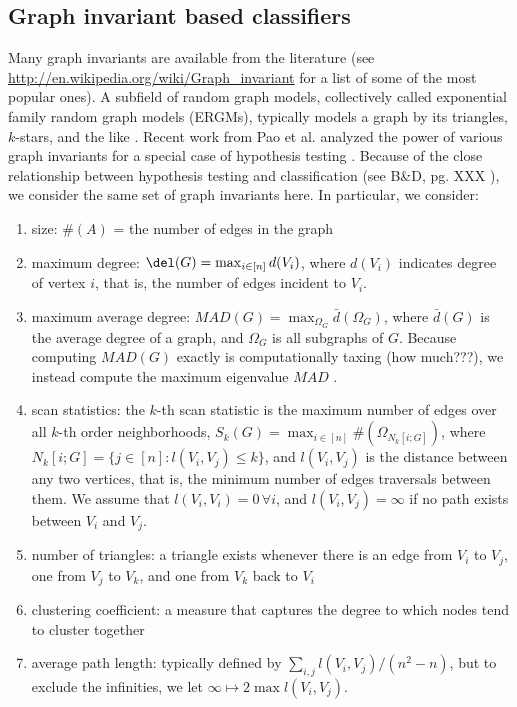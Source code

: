 \subsection{Graph invariant based classifiers} %
\label{sub:graph_invariant_based_classifiers}

Many graph invariants are available from the literature (see 
\url{http://en.wikipedia.org/wiki/Graph_invariant}
for a list of some of the most popular ones).   A subfield of random graph models, collectively called exponential family random graph models (ERGMs), typically models a graph by its triangles, $k$-stars, and the like \cite{??}.  Recent work from Pao et al. analyzed the power of various graph invariants for a special case of hypothesis testing \cite{??}.  Because of the close relationship between hypothesis testing and classification (see B\&D, pg. XXX \cite{??}), we consider the same set of graph invariants here.  In particular, we consider:
\begin{enumerate}
	\item size:  $\#(A)$ = the number of edges in the graph
	\item  maximum degree: $\del(G)= \max_{i \in [n]} d(V_i)$, where $d(V_i)$ indicates degree of vertex $i$, that is, the number of edges incident to $V_i$.
	\item maximum average degree: 	$MAD(G)=\max_{\Omega_G} \bar{d}(\Omega_G)$, where $\bar{d}(G)$ is the average degree of a graph, and $\Omega_G$ is all subgraphs of $G$.  Because computing $MAD(G)$ exactly is computationally taxing (how much???), we instead compute the maximum eigenvalue $MAD$ \cite{PaoPriebe10}.
	\item scan statistics: the $k$-th scan statistic is the maximum number of edges over all $k$-th order neighborhoods, $S_k(G) = \max_{i \in [n]} \#(\Omega_{N_k[i;G]})$, where $N_k[i;G]=\{j \in [n] : l(V_i,V_j) \leq k\}$, and $l(V_i,V_j)$ is the distance between any two vertices, that is, the minimum number of edges traversals between them.  We assume that $l(V_i,V_i)=0 \, \forall i$, and $l(V_i,V_j)=\infty$ if no path exists between $V_i$ and $V_j$.
	\item number of triangles:  a triangle exists whenever there is an edge from $V_i$ to $V_j$, one from $V_j$ to $V_k$, and one from $V_k$ back to $V_i$
	\item clustering coefficient: a measure that captures the degree to which nodes tend to cluster together
	\item average path length: typically defined by $\sum_{i,j} l(V_i,V_j)/(n^2-n)$, but to exclude the infinities, we let $\infty \mapsto 2 \max l(V_i,V_j)$.
\end{enumerate}

